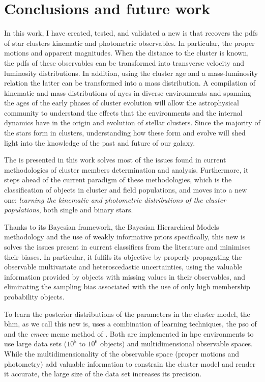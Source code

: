 \chapter{Conclusions and future work}
\label{chap:conclusions}

In this work, I have created, tested, and validated a new \acrfull{is} that recovers the \glspl{pdf} of star clusters kinematic and photometric observables. In particular, the proper motions and apparent magnitudes. When the distance to the cluster is known, the \glspl{pdf} of these observables can be transformed into transverse velocity and luminosity distributions. In addition, using the cluster age and a mass-luminosity relation the latter can be transformed into a mass distribution. A compilation of kinematic and mass distributions of \glspl{nyc} in diverse environments and spanning the ages of the early phases of cluster evolution will allow the astrophysical community to understand the effects that the environments and the internal dynamics have in the origin and evolution of stellar clusters. Since the majority of the stars form in clusters, understanding how these form and evolve will shed light into the knowledge of the past and future of our galaxy. 

The \gls{is} presented in this work solves most of the issues found in current methodologies of cluster members determination and analysis. Furthermore, it steps ahead of the current paradigm of these methodologies, which is the classification of objects in cluster and field populations, and moves into a new one: \textit{learning the kinematic and photometric distributions of the cluster populations}, both single and binary stars.

Thanks to its Bayesian framework, the Bayesian Hierarchical Models methodology and the use of weakly informative priors specifically, this new \gls{is} solves the issues present in current classifiers from the literature and minimises their biases. In particular, it fulfils its objective by properly propagating the observable multivariate and heteroscedastic uncertainties, using the valuable information provided by objects with missing values in their observables, and eliminating the sampling bias associated with the use of only high membership probability objects.

To learn the posterior distributions of the parameters in the cluster model, the \gls{bhm}, as we call this new \gls{is}, uses a combination of learning techniques, the \acrlong{pso} of \citet{Kennedy1995,Clerc2002} and the \emph{emcee} \acrlong{mcmc} method of \citet{Foreman2013}. Both are implemented in \acrlong{hpc} environments to use large data sets ($10^5$ to $10^6$ objects) and multidimensional observable spaces. While the multidimensionality of the observable space (proper motions and photometry) add valuable information to constrain the cluster model and render it accurate, the large size of the data set increases its precision. 

